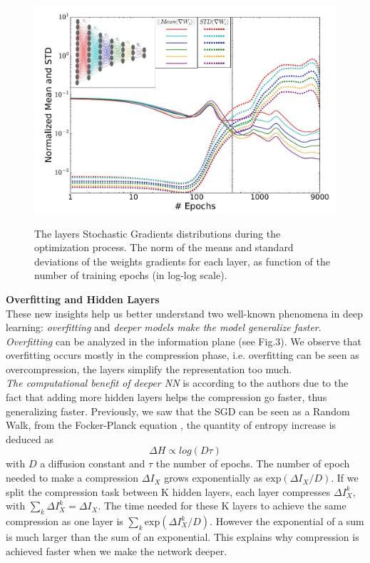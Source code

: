 \documentclass[twocolumn,superscriptaddress,aps]{revtex4-1}
\begin{document}
\begin{figure}[!htb]
\includegraphics[width=\linewidth, height=\textheight, keepaspectratio]{figs/gradients.jpeg}
\label{fig:sgd}
\caption{The layers Stochastic Gradients distributions during the optimization process. The norm of the means and standard deviations of the weights gradients for each layer, as function of the number of training epochs (in log-log scale). }
\end{figure}


\noindent \textbf{Overfitting and Hidden Layers} \\[0.15cm]
\indent These new insights help us better understand two well-known phenomena in deep learning: \textit{overfitting} and \textit{deeper models make the model generalize faster}. \\
\indent \textit{Overfitting} can be analyzed in the information plane (see Fig.3). We observe that overfitting occurs mostly in the compression phase, i.e. overfitting can be seen as overcompression, the layers simplify the representation too much. \\

\indent \textit{The computational benefit of deeper NN} is according to the authors due to the fact that adding more hidden layers helps the compression go faster, thus generalizing faster. Previously, we saw that the SGD can be seen as a Random Walk, from the Focker-Planck equation \cite{fokker}, the quantity of entropy increase is deduced as 
\begin{equation}
\Delta H \propto log(D\tau)
\label{eq:propto}
\end{equation}
with $D$ a diffusion constant and $\tau$ the number of epochs. The number of epoch needed to make a compression $\Delta I_X$ grows exponentially as $\text{exp}(\Delta I_X / D)$. If we split the compression task between K hidden layers, each layer compresses $\Delta I^k_X$, with $\sum_k \Delta I^k_X = \Delta I_X$. The time needed for these K layers to achieve the same compression as one layer is $\sum_k \text{exp}(\Delta I^k_X/D)$. However the exponential of a sum is much larger than the sum of an exponential. This explains why compression is achieved faster when we make the network deeper.
\end{document}
